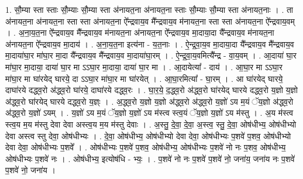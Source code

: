 \documentclass[17pt]{extarticle}
\begin{document}
1. सौ॒म्या स्ता स्ताः सौ॒म्याः सौ॒म्या स्ता अ॑नायत॒ना अ॑नायत॒ना स्ताः सौ॒म्याः सौ॒म्या स्ता अ॑नायत॒नाः । . ता अ॑नायत॒ना अ॑नायत॒ना स्ता स्ता अ॑नायत॒ना ऐ᳚न्द्रवाय॒व मै᳚न्द्रवाय॒व म॑नायत॒ना स्ता स्ता अ॑नायत॒ना ऐ᳚न्द्रवाय॒वम् । . अ॒ना॒य॒त॒ना ऐ᳚न्द्रवाय॒व मै᳚न्द्रवाय॒व म॑नायत॒ना अ॑नायत॒ना ऐ᳚न्द्रवाय॒व मा॒दाया॒दा यै᳚न्द्रवाय॒व म॑नायत॒ना अ॑नायत॒ना ऐ᳚न्द्रवाय॒व मा॒दाय॑ । . अ॒ना॒य॒त॒ना इत्य॑ना - य॒त॒नाः । . ऐ॒न्द्र॒वा॒य॒व मा॒दाया॒दा यै᳚न्द्रवाय॒व मै᳚न्द्रवाय॒व मा॒दाया॑घा॒र मा॑घा॒र मा॒दा यै᳚न्द्रवाय॒व मै᳚न्द्रवाय॒व मा॒दाया॑घा॒रम् । . ऐ॒न्द्र॒वा॒य॒वमित्यै᳚न्द्र - वा॒य॒वम् । . आ॒दाया॑ घा॒र मा॑घा॒र मा॒दाया॒ दाया॑ घा॒र मा ऽऽघा॒र मा॒दाया॒ दाया॑ घा॒र मा । . आ॒दायेत्या᳚ - दाय॑ । . आ॒घा॒र मा ऽऽघा॒र मा॑घा॒र मा घा॑रयेद् घारये॒ दा ऽऽघा॒र मा॑घा॒र मा घा॑रयेत् । . आ॒घा॒रमित्या᳚ - घा॒रम् । . आ घा॑रयेद् घारये॒ दाघा॑रये दद्ध्व॒रो अ॑द्ध्व॒रो घा॑रये॒ दाघा॑रये दद्ध्व॒रः । . घा॒र॒ये॒ द॒द्ध्व॒रो अ॑द्ध्व॒रो घा॑रयेद् घारये दद्ध्व॒रो य॒ज्ञो य॒ज्ञो अ॑द्ध्व॒रो घा॑रयेद् घारये दद्ध्व॒रो य॒ज्ञ्ः । . अ॒द्ध्व॒रो य॒ज्ञो य॒ज्ञो अ॑द्ध्व॒रो अ॑द्ध्व॒रो य॒ज्ञो॑ ऽय म॒यं ॅय॒ज्ञो अ॑द्ध्व॒रो अ॑द्ध्व॒रो य॒ज्ञो॑ ऽयम् । . य॒ज्ञो॑ ऽय म॒यं ॅय॒ज्ञो य॒ज्ञो॑ ऽय म॑स्त्व स्त्व॒यं ॅय॒ज्ञो य॒ज्ञो॑ ऽय म॑स्तु । . अ॒य म॑स्त्व स्त्व॒य म॒य म॑स्तु देवा देवा अस्त्व॒य म॒य म॑स्तु देवाः । . अ॒स्तु॒ दे॒वा॒ दे॒वा॒ अ॒स्त्व॒ स्तु॒ दे॒वा॒ ओष॑धीभ्य॒ ओष॑धीभ्यो देवा अस्त्व स्तु देवा॒ ओष॑धीभ्यः । . दे॒वा॒ ओष॑धीभ्य॒ ओष॑धीभ्यो देवा देवा॒ ओष॑धीभ्यः प॒शवे॑ प॒शव॒ ओष॑धीभ्यो देवा देवा॒ ओष॑धीभ्यः प॒शवे᳚ । . ओष॑धीभ्यः प॒शवे॑ प॒शव॒ ओष॑धीभ्य॒ ओष॑धीभ्यः प॒शवे॑ नो नः प॒शव॒ ओष॑धीभ्य॒ ओष॑धीभ्यः प॒शवे॑ नः । . ओष॑धीभ्य॒ इत्योष॑धि - भ्यः॒ । . प॒शवे॑ नो नः प॒शवे॑ प॒शवे॑ नो॒ जना॑य॒ जना॑य नः प॒शवे॑ प॒शवे॑ नो॒ जना॑य । \newline
\end{document}
